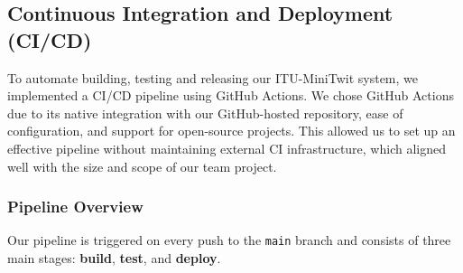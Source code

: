 \subsection{Continuous Integration and Deployment (CI/CD)}
To automate building, testing and releasing our ITU-MiniTwit system, we implemented a CI/CD pipeline using GitHub Actions. We chose GitHub Actions due to its native integration with our GitHub-hosted repository, ease of configuration, and support for open-source projects. This allowed us to set up an effective pipeline without maintaining external CI infrastructure, which aligned well with the size and scope of our team project.

\subsubsection*{Pipeline Overview}

Our pipeline is triggered on every push to the \texttt{main} branch and consists of three main stages: \textbf{build}, \textbf{test}, and \textbf{deploy}.

